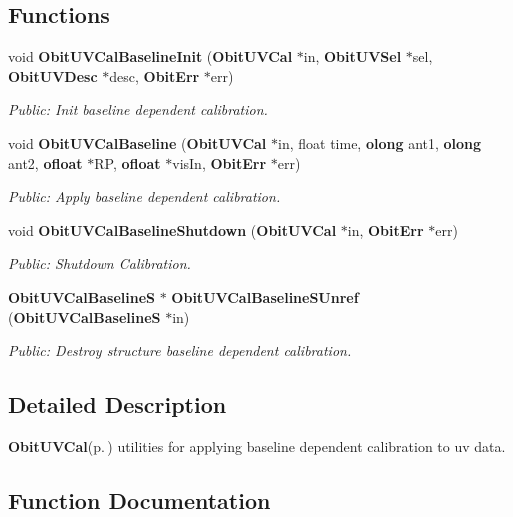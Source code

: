 \subsection*{Functions}
\begin{CompactItemize}
\item 
void {\bf Obit\-UVCal\-Baseline\-Init} ({\bf Obit\-UVCal} $\ast$in, {\bf Obit\-UVSel} $\ast$sel, {\bf Obit\-UVDesc} $\ast$desc, {\bf Obit\-Err} $\ast$err)
\begin{CompactList}\small\item\em Public: Init baseline dependent calibration. \item\end{CompactList}\item 
void {\bf Obit\-UVCal\-Baseline} ({\bf Obit\-UVCal} $\ast$in, float time, {\bf olong} ant1, {\bf olong} ant2, {\bf ofloat} $\ast$RP, {\bf ofloat} $\ast$vis\-In, {\bf Obit\-Err} $\ast$err)
\begin{CompactList}\small\item\em Public: Apply baseline dependent calibration. \item\end{CompactList}\item 
void {\bf Obit\-UVCal\-Baseline\-Shutdown} ({\bf Obit\-UVCal} $\ast$in, {\bf Obit\-Err} $\ast$err)
\begin{CompactList}\small\item\em Public: Shutdown Calibration. \item\end{CompactList}\item 
{\bf Obit\-UVCal\-Baseline\-S} $\ast$ {\bf Obit\-UVCal\-Baseline\-SUnref} ({\bf Obit\-UVCal\-Baseline\-S} $\ast$in)
\begin{CompactList}\small\item\em Public: Destroy structure baseline dependent calibration. \item\end{CompactList}\end{CompactItemize}


\subsection{Detailed Description}
{\bf Obit\-UVCal}{\rm (p.\,\pageref{structObitUVCal})} utilities for applying baseline dependent calibration to uv data. 



\subsection{Function Documentation}
